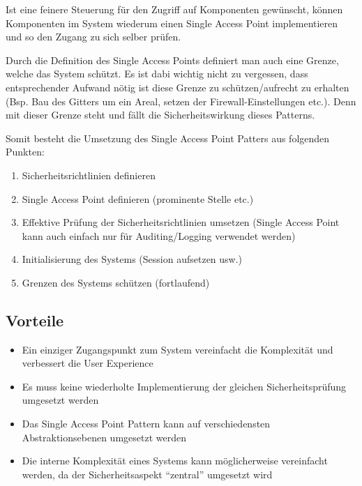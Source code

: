 Ist eine feinere Steuerung für den Zugriff auf Komponenten gewünscht, können Komponenten im System wiederum einen Single Access Point implementieren und so den Zugang zu sich selber prüfen.

Durch die Definition des Single Access Points definiert man auch eine Grenze, welche das System schützt. Es ist dabi wichtig nicht zu vergessen, dass entsprechender Aufwand nötig ist diese Grenze zu schützen/aufrecht zu erhalten (Bsp. Bau des Gitters um ein Areal, setzen der Firewall-Einstellungen etc.). Denn mit dieser Grenze steht und fällt die Sicherheitswirkung dieses Patterns.

Somit besteht die Umsetzung des Single Access Point Patters aus folgenden Punkten:

\begin{enumerate}
	\item Sicherheitsrichtlinien definieren
	\item Single Access Point definieren (prominente Stelle etc.)
	\item Effektive Prüfung der Sicherheitsrichtlinien umsetzen (Single Access Point kann auch einfach nur für Auditing/Logging verwendet werden)
	\item Initialisierung des Systems (Session aufsetzen usw.)
	\item Grenzen des Systems schützen (fortlaufend)
\end{enumerate}


\subsection*{Vorteile}
\begin{itemize}
	\item Ein einziger Zugangspunkt zum System vereinfacht die Komplexität und verbessert die User Experience
	\item Es muss keine wiederholte Implementierung der gleichen Sicherheitsprüfung umgesetzt werden
	\item Das Single Access Point Pattern kann auf verschiedensten Abstraktionsebenen umgesetzt werden
	\item Die interne Komplexität eines Systems kann möglicherweise vereinfacht werden, da der Sicherheitsaspekt ``zentral'' umgesetzt wird
\end{itemize}

